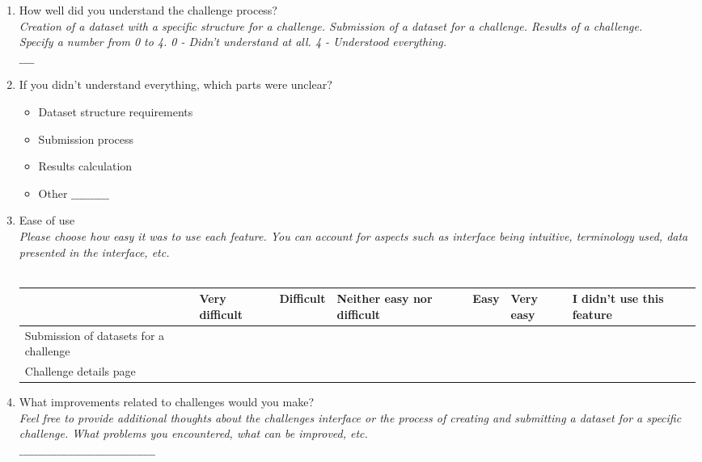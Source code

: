 \begin{enumerate}
    \item How well did you understand the challenge process? \\
    \textit{Creation of a dataset with a specific structure for a challenge. Submission of a dataset for a challenge. Results of a challenge. \\
    Specify a number from 0 to 4. 0 - Didn't understand at all. 4 - Understood everything.} \\
    $\_\_\_\_$

    \item If you didn't understand everything, which parts were unclear?
    \begin{itemize}[label=$\square$]
        \item Dataset structure requirements
        \item Submission process
        \item Results calculation
        \item Other $\_\_\_\_\_\_\_\_\_\_$
    \end{itemize}
    
    \item Ease of use \\
    \textit{Please choose how easy it was to use each feature. You can account for aspects such as interface being intuitive, terminology used, data presented in the interface, etc.} \\
    \\
    {\footnotesize
    \begin{tabularx}{\textwidth}{ X | X | l | X | l | l | X }
        & Very difficult & Difficult & Neither easy nor difficult & Easy & Very easy & I didn't use this feature \\
        \hline Submission of datasets for a challenge & & & & & & \\
        \hline Challenge details page & & & & & & \\
    \end{tabularx}
    }

    \item What improvements related to challenges would you make? \\
    \textit{Feel free to provide additional thoughts about the challenges interface or the process of creating and submitting a dataset for a specific challenge. What problems you encountered, what can be improved, etc.} \\
    $\_\_\_\_\_\_\_\_\_\_\_\_\_\_\_\_\_\_\_\_\_\_\_\_\_\_\_\_\_\_\_\_\_\_\_\_$


\end{enumerate}
